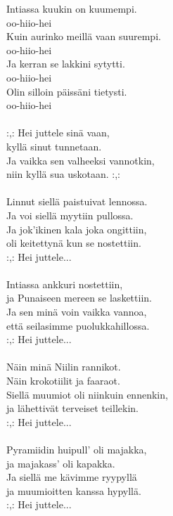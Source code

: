 
Intiassa kuukin on kuumempi. \\ oo-hiio-hei \\ Kuin aurinko meillä vaan suurempi. \\ oo-hiio-hei \\ Ja kerran se lakkini sytytti. \\ oo-hiio-hei \\ Olin silloin päissäni tietysti. \\ oo-hiio-hei \\ \hspace{10mm} \\ :,: Hei juttele sinä vaan, \\ kyllä sinut tunnetaan. \\ Ja vaikka sen valheeksi vannotkin, \\ niin kyllä sua uskotaan. :,: \\ \hspace{10mm} \\ Linnut siellä paistuivat lennossa. \\ Ja voi siellä myytiin pullossa. \\ Ja jok'ikinen kala joka ongittiin, \\ oli keitettynä kun se nostettiin. \\ :,: Hei juttele... \\ \hspace{10mm} \\ Intiassa ankkuri nostettiin, \\ ja Punaiseen mereen se laskettiin. \\ Ja sen minä voin vaikka vannoa, \\ että seilasimme puolukkahillossa. \\ :,: Hei juttele... \\ \hspace{10mm} \\ Näin minä Niilin rannikot. \\ Näin krokotiilit ja faaraot. \\ Siellä muumiot oli niinkuin ennenkin, \\ ja lähettivät terveiset teillekin. \\ :,: Hei juttele... \\ \hspace{10mm} \\ Pyramiidin huipull' oli majakka, \\ ja majakass' oli kapakka. \\ Ja siellä me kävimme ryypyllä \\ ja muumioitten kanssa hypyllä. \\ :,: Hei juttele... \\ 